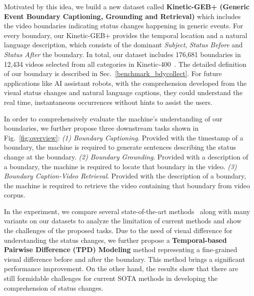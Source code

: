 \documentclass[runningheads]{llncs}
\begin{document}
Motivated by this idea, we build a new dataset called \textbf{Kinetic-GEB+ (Generic Event Boundary Captioning, Grounding and Retrieval)} which includes the video boundaries indicating status changes happening in generic events. 
For every boundary, our Kinetic-GEB+ provides the temporal location and a natural language description, which consists of the dominant \textit{Subject}, \textit{Status Before} and \textit{Status After} the boundary. 
In total, our dataset includes 176,681 boundaries in 12,434 videos selected from all categories in Kinetic-400~\cite{carreira2017quo}. 
The detailed definition of our boundary is described in Sec.~\ref{benchmark_bdycollect}. 
For future applications like AI assistant robots, with the comprehension developed from the visual status changes and natural language captions, they could understand the real time, instantaneous occurrences without hints to assist the users. 


In order to comprehensively evaluate the machine’s understanding of our boundaries, we further propose three downstream tasks shown in Fig.~\ref{fig:overview}: \textit{(1) Boundary Captioning}. Provided with the timestamp of a boundary, the machine is required to generate sentences describing the status change at the boundary. \textit{(2) Boundary Grounding}. Provided with a description of a boundary, the machine is required to locate that boundary in the video. \textit{(3) Boundary Caption-Video Retrieval}. Provided with the description of a boundary, the machine is required to retrieve the video containing that boundary from video corpus. 


In the experiment, we compare several state-of-the-art methods~\cite{lei2018tvqa,luo2020univl,zhu2020actbert,2DTAN_2020_AAAI,bain2021frozen} along with many variants on our datasets to analyze the limitation of current methods and show the challenges of the proposed tasks. 
Due to the need of visual difference for understanding the status changes, we further propose a \textbf{Temporal-based Pairwise Difference (TPD) Modeling} method representing a fine-grained visual difference before and after the boundary. This method brings a significant performance improvement. On the other hand, the results show that there are still formidable challenges for current SOTA methods in developing the comprehension of status changes.
\end{document}

